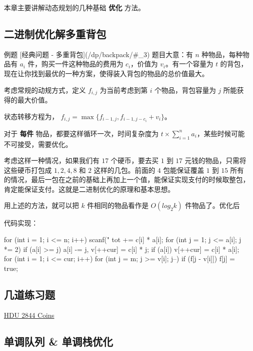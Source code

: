 
本章主要讲解动态规划的几种基础 \textbf{ 优化 } 方法。

\subsection{二进制优化解多重背包}

\begin{NOTE}{ 例题 [经典问题 - 多重背包](/dp/backpack/#_3)}{}
题目大意：有 $n$ 种物品，每种物品有 $a_i$ 件，购买一件这种物品的费用为 $c_i$，价值为 $v_i$。有一个容量为 $t$ 的背包，现在让你找到最优的一种方案，使得装入背包的物品的总价值最大。
\end{NOTE}


考虑常规的动规方式，定义 $f_{i,j}$ 为当前考虑到第 $i$ 个物品，背包容量为 $j$ 所能获得的最大价值。

状态转移方程为， $f_{i,j}=\max\{f_{i-1,j},f_{i-1,j-c_i}+v_i\}$。

对于 \textbf{ 每件 } 物品，都要这样循环一次，时间复杂度为 $t\times \sum_{i=1}^n a_i$，某些时候可能不可接受，需要优化。

考虑这样一种情况，如果我们有 $17$ 个硬币，要去买 $1$ 到 $17$ 元钱的物品，只需将这些硬币打包成 $1,2,4,8$ 和 $2$ 这样的几包。前面的 $4$ 包能保证覆盖 $1$ 到 $15$ 所有的情况，最后一包在之前的基础上再加上一个值，能保证实现支付的时候取整包，肯定能保证支付。这就是二进制优化的原理和基本思想。

用上述的方法，就可以把 $k$ 件相同的物品看作是 $O(log_2 k)$ 件物品了。优化后

代码实现：

\begin{cppcode}
for (int i = 1; i <= n; i++) {
  scanf("%
  tot += c[i] * a[i];
  for (int j = 1; j <= a[i]; j *= 2)
    if (a[i] >= j) a[i] -= j, v[++cur] = c[i] * j;
  if (a[i]) v[++cur] = c[i] * a[i];
}
for (int i = 1; i <= cur; i++)
  for (int j = m; j >= v[i]; j--)
    if (f[j - v[i]]) f[j] = true;
\end{cppcode}

\subsection{几道练习题}

\href{http://acm.hdu.edu.cn/showproblem.php?pid=2844}{HDU 2844 Coins}

\subsection{单调队列 \& 单调栈优化}


